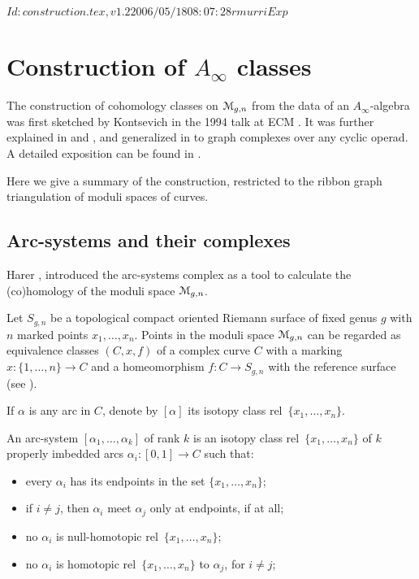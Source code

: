 \RCSID $Id: construction.tex,v 1.2 2006/05/18 08:07:28 rmurri Exp $


\chapter{Construction of $A_\infty$ classes}
\label{cha:construction}

The construction of cohomology classes on $\mathcal{M}_{g,n}$ from the data of
an $A_\infty$-algebra was first sketched by Kontsevich in the 1994 talk at
ECM \cite{kontsevich;feynman}. It was further explained in
\cite{penkava-schwarz} and \cite{penkava;graph-complexes}, and
generalized in \cite{markl;cyclic} to graph complexes over any cyclic
operad.  A detailed exposition can be found in \cite{conant-vogtmann}.

Here we give a summary of the construction, restricted to the ribbon
graph triangulation of moduli spaces of curves.


\section{Arc-systems and their complexes}
\label{sec:arc-systems}

Harer \cite{harer;cohomological-dimension}, introduced the arc-systems
complex as a tool to calculate the (co)homology of the moduli space
$\mathcal{M}_{g,n}$.

Let $S_{g,n}$ be a topological compact oriented Riemann surface of
fixed genus $g$ with $n$ marked points $x_1, \ldots, x_n$.  Points in the
moduli space $\mathcal{M}_{g,n}$ can be regarded as equivalence classes
$(C,x,f)$ of a complex curve $C$ with a marking $x:\{1,\ldots,n\}\to C$ and a
homeomorphism $f:C\to S_{g,n}$ with the reference surface (see
).

If $\alpha$ is any arc in $C$, denote by $[\alpha]$ its isotopy class rel~$\{x_1,
\ldots, x_n\}$.

\begin{definition}
  An arc-system $[\alpha_1, \ldots, \alpha_k]$ of rank $k$ is an isotopy class
  rel~$\{x_1, \ldots, x_n\}$ of $k$ properly imbedded arcs $\alpha_i : [0,1] \to C$
  such that:
  \begin{itemize}
  \item every $\alpha_i$ has its endpoints in the set $\{x_1, \ldots, x_n\}$;
  \item if $i \neq j$, then $\alpha_i$ meet $\alpha_j$ only at endpoints, if at all;
  \item no $\alpha_i$ is null-homotopic rel~$\{x_1, \ldots, x_n\}$;
  \item no $\alpha_i$ is homotopic rel~$\{x_1, \ldots, x_n\}$ to $\alpha_j$, for $i \neq
    j$;
  \end{itemize}
\end{definition}

